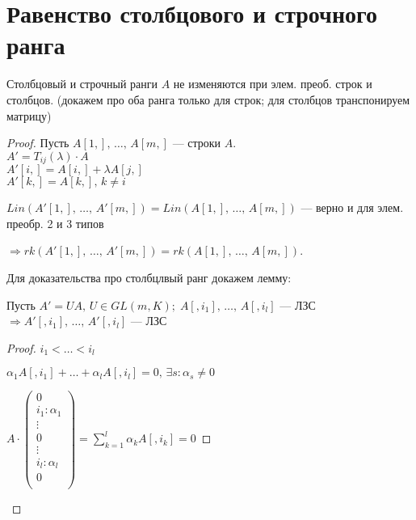 \section{Равенство столбцового и строчного ранга}

\begin{theorem-non} 

    Столбцовый и строчный ранги $A$ не изменяются при элем. преоб. строк и столбцов. 
    (докажем про оба ранга только для строк; для столбцов транспонируем матрицу)
    \begin{proof}
        
        Пусть $A[1,],\, \dots,\, A[m,]$ --- строки $A$.\\
        $A' = T_{ij}(\lambda) \cdot A$\\
        $A'[i,] = A[i,] + \lambda A[j,]$\\
        $A'[k,] = A[k,],\, k \neq i$

        $Lin(A'[1,],\, \dots,\, A'[m,]) = Lin(A[1,],\, \dots,\, A[m,])$ --- верно и для элем. преобр. 2 и 3 типов
        
        $\Longrightarrow rk(A'[1,],\, \dots,\, A'[m,]) = rk(A[1,],\, \dots,\, A[m,])$.

        Для доказательства про столбцлвый ранг докажем лемму:
        \begin{lemma} 

            Пусть $A' = UA,\, U \in GL(m, K);\; A[, i_1],\, \dots,\, A[, i_l]$ --- ЛЗС $\Longrightarrow A'[, i_1],\, \dots,\, A'[, i_l]$ --- ЛЗС
            
            \begin{proof}

                $i_1 < \dots < i_l$   

                $\alpha_1 A[, i_1] + \dots + \alpha_l A[, i_l] = 0,\, \exists s: \alpha_s \neq 0$

                $A \cdot
                \begin{pmatrix}
                    0\\
                    i_1: \alpha_1\\
                    \vdots\\
                    0\\
                    \vdots\\
                    i_l: \alpha_l\\
                    0\\
                \end{pmatrix}
                = \sum_{k=1}^l \alpha_k A[, i_k] = 0$


\end{proof}
\end{lemma}
\end{proof}
\end{theorem-non}
